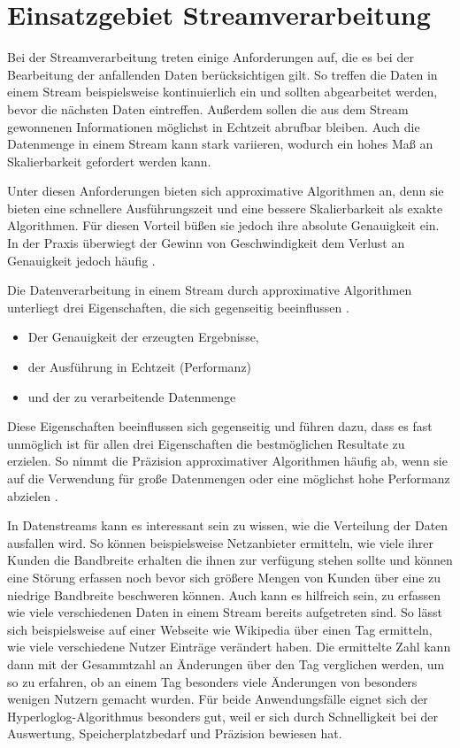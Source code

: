 \section{Einsatzgebiet Streamverarbeitung}
Bei der Streamverarbeitung treten einige Anforderungen auf, 
die es bei der Bearbeitung der anfallenden Daten berücksichtigen gilt. 
So treffen die Daten in einem Stream beispielsweise kontinuierlich ein und sollten abgearbeitet werden,
bevor die nächsten Daten eintreffen. 
Außerdem sollen die aus dem Stream gewonnenen Informationen möglichst in Echtzeit abrufbar bleiben.
Auch die Datenmenge in einem Stream kann stark variieren, wodurch ein hohes Maß an Skalierbarkeit gefordert werden kann.

Unter diesen Anforderungen bieten sich approximative Algorithmen an, denn sie bieten eine schnellere Ausführungszeit und eine bessere Skalierbarkeit als exakte Algorithmen. 
Für diesen Vorteil büßen sie jedoch ihre absolute Genauigkeit ein. 
In der Praxis überwiegt der Gewinn von Geschwindigkeit dem Verlust an Genauigkeit jedoch häufig \cite{maas2019}. 

Die Datenverarbeitung in einem Stream durch approximative Algorithmen unterliegt drei Eigenschaften, 
die sich gegenseitig beeinflussen \cite{maas2019}. 

\begin{itemize}
\item
Der Genauigkeit der erzeugten Ergebnisse,
\item
der Ausführung in Echtzeit (Performanz)
\item
und der zu verarbeitende Datenmenge
\end{itemize}

Diese Eigenschaften beeinflussen sich gegenseitig und führen dazu, 
dass es fast unmöglich ist für allen drei Eigenschaften die bestmöglichen Resultate zu erzielen.
So nimmt die Präzision approximativer Algorithmen häufig ab, 
wenn sie auf die Verwendung für große Datenmengen oder eine möglichst hohe Performanz abzielen \cite{maas2019}.

In Datenstreams kann es interessant sein zu wissen, wie die Verteilung der Daten ausfallen wird. 
So können beispielsweise Netzanbieter ermitteln, 
wie viele ihrer Kunden die Bandbreite erhalten die ihnen zur verfügung stehen sollte 
und können eine Störung erfassen noch bevor sich größere Mengen von Kunden über eine zu niedrige Bandbreite beschweren können.
Auch kann es hilfreich sein, zu erfassen wie viele verschiedenen Daten in einem Stream bereits aufgetreten sind. 
So lässt sich beispielsweise auf einer Webseite wie Wikipedia über einen Tag ermitteln, 
wie viele verschiedene Nutzer Einträge verändert haben. 
Die ermittelte Zahl kann dann mit der Gesammtzahl an Änderungen über den Tag verglichen werden, 
um so zu erfahren, ob an einem Tag besonders viele Änderungen von  besonders wenigen Nutzern gemacht wurden.
Für beide Anwendungsfälle eignet sich der Hyperloglog-Algorithmus besonders gut, 
weil er sich durch Schnelligkeit bei der Auswertung, Speicherplatzbedarf und Präzision bewiesen hat. \cite{quelle}

